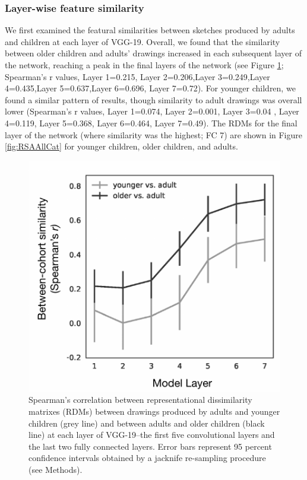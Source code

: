 \documentclass[10pt, letterpaper]{article}
\newenvironment{CodeChunk}{}{}
\begin{document}
\subsubsection{Layer-wise feature
similarity}\label{layer-wise-feature-similarity}

We first examined the featural similarities between sketches produced by
adults and children at each layer of VGG-19. Overall, we found that the
similarity between older children and adults' drawings increased in each
subsequent layer of the network, reaching a peak in the final layers of
the network (see Figure \ref{fig:layerWise}; Spearman's r values, Layer
1=0.215, Layer 2=0.206,Layer 3=0.249,Layer 4=0.435,Layer 5=0.637,Layer
6=0.696, Layer 7=0.72). For younger children, we found a similar pattern
of results, though similarity to adult drawings was overall lower
(Spearman's r values, Layer 1=0.074, Layer 2=0.001, Layer 3=0.04 , Layer
4=0.119, Layer 5=0.368, Layer 6=0.464, Layer 7=0.49). The RDMs for the
final layer of the network (where similarity was the highest; FC 7) are
shown in Figure \ref{fig:RSAAllCat} for younger children, older
children, and adults.

\begin{CodeChunk}
\begin{figure}[H]

{\centering \includegraphics{figs/layerWise-1} 

}

\caption[Spearman's correlation between representational dissimilarity matrixes (RDMs) between drawings produced by adults and younger children (grey line) and between adults and older children (black line) at each layer of VGG-19--the first five convolutional layers and the last two fully connected layers]{Spearman's correlation between representational dissimilarity matrixes (RDMs) between drawings produced by adults and younger children (grey line) and between adults and older children (black line) at each layer of VGG-19--the first five convolutional layers and the last two fully connected layers. Error bars represent 95 percent confidence intervals obtained by a jacknife re-sampling procedure (see Methods).}\label{fig:layerWise}
\end{figure}
\end{CodeChunk}
\end{document}
